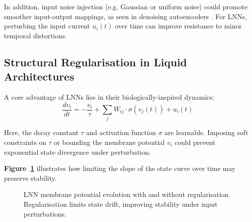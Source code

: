 In addition, input noise injection (e.g. Gaussian or uniform noise) could promote smoother input-output mappings, as seen in denoising autoencoders \cite{vincent2008extracting}. For LNNs, perturbing the input current $u_i(t)$ over time can improve resistance to minor temporal distortions.

\subsection*{Structural Regularisation in Liquid Architectures}

A core advantage of LNNs lies in their biologically-inspired dynamics:
\begin{equation}
\frac{dv_i}{dt} = -\frac{v_i}{\tau} + \sum_j W_{ij} \cdot \sigma(v_j(t)) + u_i(t)
\end{equation}

Here, the decay constant $\tau$ and activation function $\sigma$ are learnable. Imposing soft constraints on $\tau$ or bounding the membrane potential $v_i$ could prevent exponential state divergence under perturbation.

\textbf{Figure~\ref{fig:lnn_dynamics_defence}} illustrates how limiting the slope of the state curve over time may preserve stability.

\begin{figure}[H]
    \centering
    \caption{LNN membrane potential evolution with and without regularisation. Regularisation limits state drift, improving stability under input perturbations.}
    \label{fig:lnn_dynamics_defence}
    \end{figure}

